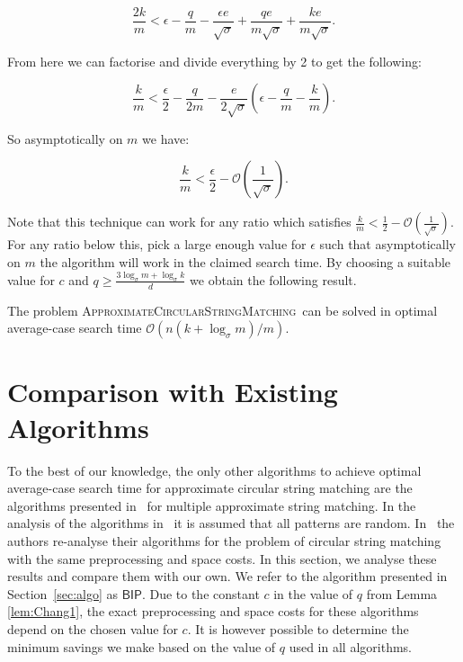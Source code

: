 \documentclass[runningheads, envcountsame, a4paper]{llncs}\usepackage{etex}
\newcommand{\ACSM}{\textsc{ApproximateCircularStringMatching}}
\newcommand{\cO}{\mathcal{O}}
\begin{document}
$$\frac{2k}{m} < \epsilon - \frac{q}{m} - \frac{\epsilon e}{\sqrt{\sigma}} + \frac{qe}{m \sqrt{\sigma}} + \frac{ke}{m\sqrt{\sigma}}.$$

\noindent From here we can factorise and divide everything by 2 to get the following:

$$\frac{k}{m} < \frac{\epsilon}{2} - \frac{q}{2m} - \frac{e}{2\sqrt{\sigma}}(\epsilon - \frac{q}{m} - \frac{k}{m}).$$

\noindent So asymptotically on $m$ we have:

$$ \frac{k}{m} < \frac{\epsilon}{2}- \cO(\frac{1}{\sqrt{\sigma}}).$$

\noindent Note that this technique can work for any ratio which satisfies $\frac{k}{m} < \frac{1}{2}- \cO(\frac{1}{\sqrt{\sigma}})$.
For any ratio below this, pick a large enough value for $\epsilon$ such that asymptotically on $m$ the algorithm will work in the claimed search time.
By choosing a suitable value for $c$ and $q \geq \frac{3 \log_\sigma m + \log_\sigma k}{d}$ we obtain the following result.


\begin{theorem}
The problem \ACSM\ can be solved in optimal average-case search time $\cO(n(k+ \log_\sigma m)/m)$.
\end{theorem}

\section{Comparison with Existing Algorithms}

To the best of our knowledge, the only other algorithms to achieve optimal average-case search time for approximate circular string matching are the algorithms presented in~\cite{Fredriksson:2004:ASM:1005813.1041513} for multiple approximate string matching. In the analysis of the algorithms in~\cite{Fredriksson:2004:ASM:1005813.1041513} it is assumed that all patterns are random. In~\cite{doi:10.1142/S0129054106004455} the authors re-analyse their algorithms for the problem of circular string matching with the same preprocessing and space costs. 
In this section, we analyse these results and compare them with our own. 
We refer to the algorithm presented in Section~\ref{sec:algo} as $\textsf{BIP}$. Due to the constant $c$ in the value of $q$ from Lemma \ref{lem:Chang1}, the exact preprocessing and space costs for these algorithms depend on the chosen value for $c$. It is however possible to determine the minimum savings we make based on the value of $q$ used in all algorithms.
\end{document}
